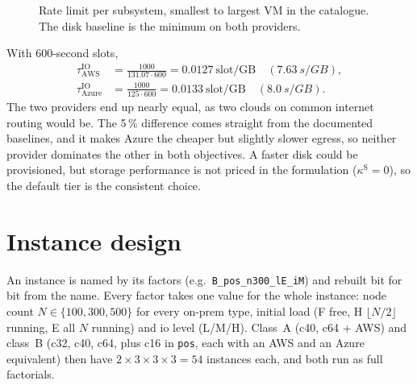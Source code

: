 \documentclass[11pt,a4paper]{article}
\newcommand{\tauIO}{\tau^{\mathrm{IO}}}
\newcommand{\code}[1]{\texttt{#1}}
\begin{document}
\begin{figure}[ht]
\centering
{}
\caption{Rate limit per subsystem, smallest to largest VM in the catalogue. The disk
baseline is the minimum on both providers.}
\label{fig:bottleneck}
\end{figure}

With 600-second slots,
\begin{align}
  \tauIO_{\mathrm{AWS}}   &= \frac{1000}{131.07 \cdot 600} = 0.0127\ \text{slot/GB}\quad(\SI{7.63}{s/GB}),\\
  \tauIO_{\mathrm{Azure}} &= \frac{1000}{125 \cdot 600} = 0.0133\ \text{slot/GB}\quad(\SI{8.0}{s/GB}).
\end{align}
The two providers end up nearly equal, as two clouds on common internet routing
would be. The 5\,\% difference comes straight from the documented baselines, and it
makes Azure the cheaper but slightly slower egress, so neither provider dominates
the other in both objectives. A faster disk could be provisioned, but storage
performance is not priced in the formulation ($\kappa^{\mathrm S}=0$), so the
default tier is the consistent choice.

\section{Instance design}\label{sec:design}
An instance is named by its factors (e.g.\ \code{B\_pos\_n300\_lE\_iM}) and
rebuilt bit for bit from the name. Every factor takes one value for the whole
instance: node count $N\in\{100,300,500\}$ for every on-prem type, initial load
(F free, H $\lfloor N/2\rfloor$ running, E all $N$ running) and io level (L/M/H).
Class~A (c40, c64 + AWS) and class~B (c32, c40, c64, plus c16 in \code{pos}, each
with an AWS and an Azure equivalent) then have $2\times3\times3\times3=54$ instances
each, and both run as full factorials.
\end{document}
